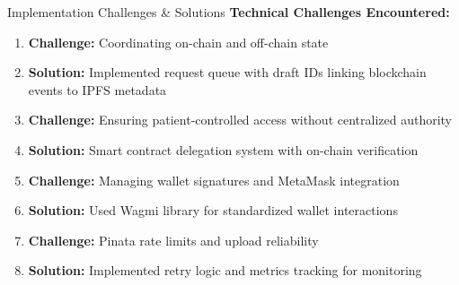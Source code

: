 \documentclass[10pt]{beamer}
\let\olditemize\itemize
\let\endolditemize\enditemize
\renewenvironment{itemize}
  {\olditemize\justifying}
  {\endolditemize}
\begin{document}
\begin{frame}{Implementation Challenges \& Solutions}
\textbf{Technical Challenges Encountered:}

\begin{enumerate}
\item \textbf{Challenge:} Coordinating on-chain and off-chain state
    \begin{itemize}
    \item \textbf{Solution:} Implemented request queue with draft IDs linking blockchain events to IPFS metadata
    \end{itemize}

\item \textbf{Challenge:} Ensuring patient-controlled access without centralized authority
    \begin{itemize}
    \item \textbf{Solution:} Smart contract delegation system with on-chain verification
    \end{itemize}

\item \textbf{Challenge:} Managing wallet signatures and MetaMask integration
    \begin{itemize}
    \item \textbf{Solution:} Used Wagmi library for standardized wallet interactions
    \end{itemize}

\item \textbf{Challenge:} Pinata rate limits and upload reliability
    \begin{itemize}
    \item \textbf{Solution:} Implemented retry logic and metrics tracking for monitoring
    \end{itemize}
\end{enumerate}
\end{frame}
\end{document}
